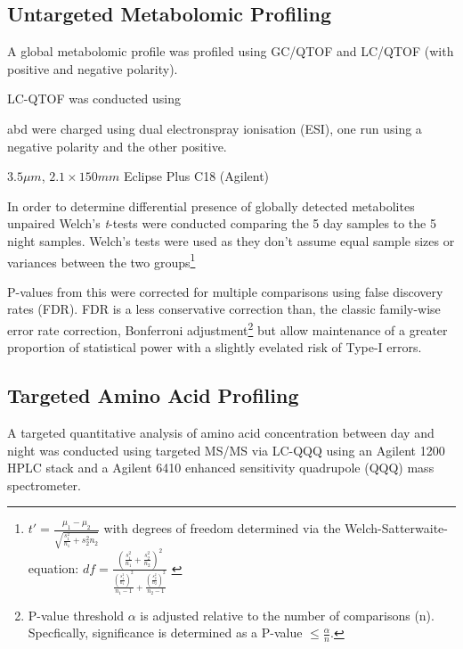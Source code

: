 \subsection{Untargeted Metabolomic Profiling} 

A global metabolomic profile was profiled using 
GC/QTOF and LC/QTOF (with positive and negative polarity).

LC-QTOF was conducted using


abd were charged using dual electronspray ionisation (ESI), one run
using a negative polarity and the other positive. 



\(3.5\mu m\), \(2.1 \times 150mm\) Eclipse Plus C18 (Agilent) 





In order to determine differential presence of globally detected metabolites
unpaired Welch's \textit{t}-tests were conducted comparing the 5 day samples to the 5
night samples. Welch's tests were used as they don't assume equal sample sizes or variances
between the two groups\citep{Welch1947}\footnote{
    \(t' = \frac{\mu_1 - \mu_2}{\sqrt{\frac{s^2_1}{n_1} + {s^2_2}{n_2}}}\)
    with degrees of freedom determined via the Welch-Satterwaite-equation:
    \(df = \frac{(\frac{s^2_1}{n_1} + \frac{s^2_2}{n_2})^2}{\frac{(\frac{s^2_1}{n_1})^2}{n_1 - 1} + \frac{(\frac{s^2_2}{n_2})^2}{n_2 - 1}}\)
    \citep{Ruxton2006}
}

P-values from this were corrected 
for multiple comparisons using false discovery rates (FDR).  FDR is a
less conservative correction than, the classic family-wise error rate correction,
Bonferroni adjustment\footnote{
    P-value threshold \(\alpha\) is adjusted relative to the number of comparisons (n). 
Specfically, significance is determined as a P-value \(\leq \frac{\alpha}{n}\).} but
allow maintenance of a greater proportion of statistical power with a 
slightly evelated risk of Type-I errors. 






\subsection{Targeted Amino Acid Profiling}

A targeted quantitative analysis of amino acid concentration between day
and night was conducted
using targeted MS/MS via LC-QQQ using an Agilent 1200 HPLC stack and a 
Agilent 6410 enhanced sensitivity  
quadrupole (QQQ) mass spectrometer. 





